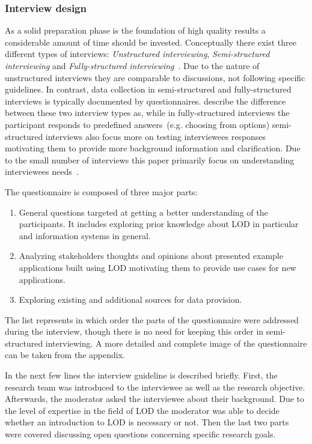 \documentclass{article}
\begin{document}
\subsubsection{Interview design}
As a solid preparation phase is the foundation of high quality results a considerable amount of time should be invested. Conceptually there exist three different types of interviews: \textit{Unstructured interviewing}, \textit{Semi-structured interviewing} and \textit{Fully-structured interviewing}~\cite{book:bernard-antropology-semi-structured-interview}. 
Due to the nature of unstructured interviews they are comparable to discussions, not following specific guidelines. In contrast, data collection in semi-structured and fully-structured interviews is typically documented by questionnaires. \citet{article:harris2010mixing} describe the difference between these two interview types as, while in fully-structured interviews the participant responds to predefined answers~(e.g. choosing from options) semi-structured interviews also focus more on testing interviewees responses motivating them to provide more background information and clarification. Due to the small number of interviews this paper primarily focus on understanding interviewees needs~\cite{book:miles2005handbook}.

The questionnaire is composed of three major parts:
\begin{enumerate}
	\item General questions targeted at getting a better understanding of the participants. It includes exploring prior knowledge about LOD in particular and information systems in general. 
	\item Analyzing stakeholders thoughts and opinions about presented example applications built using LOD motivating them to provide use cases for new applications. 
	\item Exploring existing and additional sources for data provision. 
\end{enumerate}


The list represents in which order the parts of the questionnaire were addressed during the interview, though there is no need for keeping this order in semi-structured interviewing.
A more detailed and complete image of the questionnaire can be taken from the appendix.

In the next few lines the interview guideline is described briefly.
First, the research team was introduced to the interviewee as well as the research objective. Afterwards, the moderator asked the interviewee about their background. Due to the level of expertise in the field of LOD the moderator was able to decide whether an introduction to LOD is necessary or not. Then the last two parts were covered discussing open questions concerning specific research goals.
\end{document}
